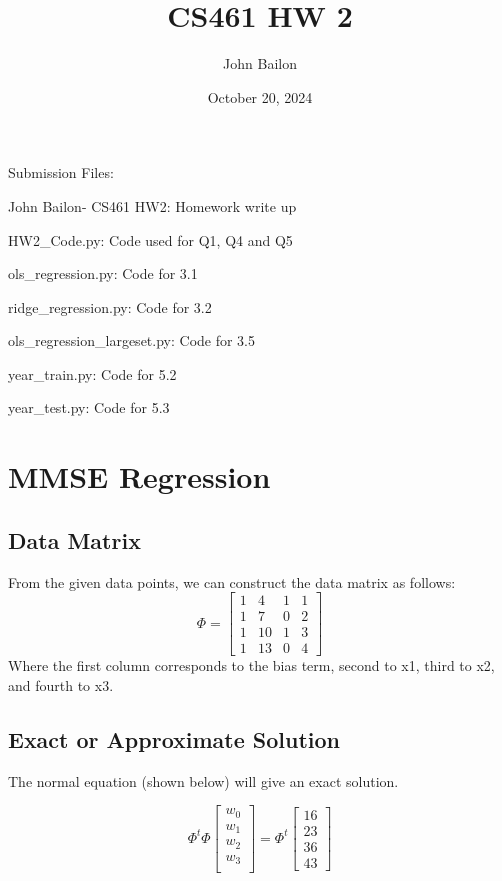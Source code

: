 \documentclass{article}
\title{CS461 HW 2}
\author{John Bailon}
\date{October 20, 2024}
\begin{document}
\maketitle

\noindent
Submission Files:

John Bailon- CS461 HW2: Homework write up

HW2\_Code.py: Code used for Q1, Q4 and Q5

ols\_regression.py: Code for 3.1

ridge\_regression.py: Code for 3.2

ols\_regression\_largeset.py: Code for 3.5

year\_train.py: Code for 5.2

year\_test.py: Code for 5.3


\section{MMSE Regression}
\subsection{Data Matrix}
From the given data points, we can construct the data matrix as follows:
\[
\Phi = \begin{bmatrix}
1 & 4 & 1 & 1\\
1 & 7 & 0 & 2\\
1 & 10 & 1 & 3\\
1 & 13 & 0 & 4
\end{bmatrix}
\]
\noindent
Where the first column corresponds to the bias term, second to x1, third to x2, and fourth to x3.

\subsection{Exact or Approximate Solution}

The normal equation (shown below) will give an exact solution.

\[
\Phi^t \Phi \begin{bmatrix}
w_0\\
w_1\\
w_2\\
w_3\\
\end{bmatrix} = \Phi^t \begin{bmatrix}
16\\
23\\
36\\
43
\end{bmatrix} 
\]
\end{document}
